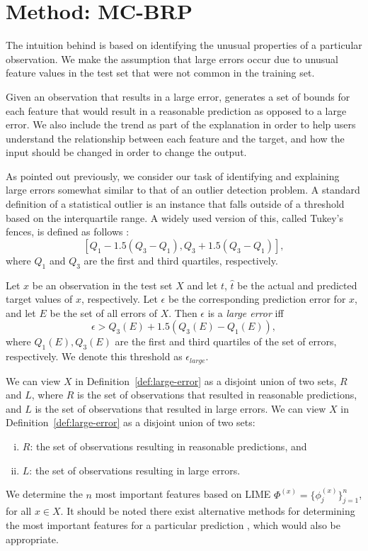 
\section{Method: MC-BRP}
\label{section:3}

The intuition behind \OurMethod{} is based on identifying the unusual properties of a particular observation. 
We make the assumption that large errors occur due to unusual feature values in the test set that were not common in the training set. 

Given an observation that results in a large error, \OurMethod{} generates a set of bounds for each feature that would result in a reasonable prediction as opposed to a large error. 
We also include the trend as part of the explanation in order to help users understand the relationship between each feature and the target, and how the input should be changed in order to change the output. 

As pointed out previously, we consider our task of identifying and explaining large errors somewhat similar to that of an outlier detection problem. 
A standard definition of a statistical outlier is an instance that falls outside of a threshold based on the interquartile range. 
A widely used version of this, called Tukey's fences, is defined as follows \citep{tukey-1977-exploratory}:
\[ 
[Q_1 - 1.5(Q_3 - Q_1), Q_3 + 1.5(Q_3 - Q_1)],
\]
where $Q_1$ and $Q_3$ are the first and third quartiles, respectively. 

\begin{definition}\rm
\label{def:large-error}
Let $x$ be an observation in the test set $X$ and let $t$, $\hat{t}$ be the actual and predicted target values of $x$, respectively. Let $\epsilon$ be the corresponding prediction error for $x$, and let $E$ be the set of all errors of $X$. Then $\epsilon$ is a \emph{large error} iff 
\[
\epsilon > Q_3(E) + 1.5(Q_3(E) - Q_1(E)),
\]
where $Q_1(E), Q_3(E)$ are the first and third quartiles of the set of errors, respectively. 
We denote this threshold as $\epsilon_{large}$.
\end{definition}

\noindent%
We can view $X$ in Definition~\ref{def:large-error} as a disjoint union of two sets, $R$ and $L$, where $R$ is the set of observations that resulted in reasonable predictions, and $L$ is the set of observations that resulted in large errors. 
\fi
We can view $X$ in Definition~\ref{def:large-error} as a disjoint union of two sets:
\begin{enumerate}[(i)]
	\item $R$: the set of observations resulting in reasonable predictions, and
	\item $L$: the set of observations resulting in large errors.
\end{enumerate}
We determine the $n$ most important features based on LIME $\Phi^{(x)} = \{\phi_j^{(x)}\}_{j=1}^{n}$, for all $x \in X$. 
It should be noted there exist alternative methods for determining the most important features for a particular prediction \citep{lundberg_unified_2017}, which would also be appropriate. 



